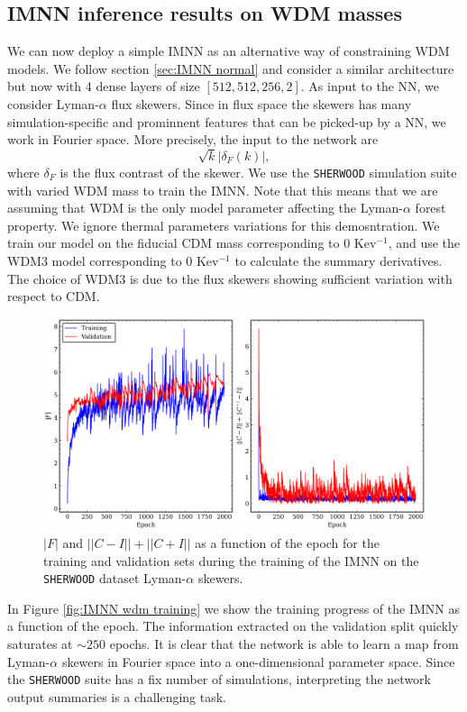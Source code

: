 \subsection{IMNN inference results on WDM masses}\label{sec:IMNN}
We can now deploy a simple IMNN as an alternative way of constraining WDM models. We follow section \ref{sec:IMNN normal} and consider a similar architecture but now with 4 dense layers of size $[512, 512, 256, 2]$. As input to the NN, we consider Lyman-$\alpha$ flux skewers. Since in flux space the skewers has many simulation-specific and prominnent features that can be picked-up by a NN, we work in Fourier space. More precisely, the input to the network are 
\begin{equation}
    \sqrt{k} |\delta_F (k)|,
\end{equation}
where $\delta_F$ is the flux contrast of the skewer.
We use the \texttt{SHERWOOD} simulation suite with varied WDM mass to train the IMNN. Note that this means that we are assuming that WDM is the only model parameter affecting the Lyman-$\alpha$ forest property. We ignore thermal parameters variations for this demosntration. We train our model on the fiducial CDM mass corresponding to $0$ Kev$^{-1}$, and use the WDM3 model corresponding to $0$ Kev$^{-1}$ to calculate the summary derivatives. The choice of WDM3 is due to the flux skewers showing sufficient variation with respect to CDM.

\begin{figure}
    \centering
    \includegraphics[width=0.95\linewidth]{img/ML/WDM_training_plot.png}
    \caption{$|F|$ and $||C-I ||+||C+I||$ as a function of the epoch for the training and validation sets during the training of the IMNN on the \texttt{SHERWOOD} dataset Lyman-$\alpha$ skewers.}
    \label{fig:IMNN  wdm training}
\end{figure}
In Figure \ref{fig:IMNN wdm training} we show the training progress of the IMNN as a function of the epoch. The information extracted on the validation split quickly saturates at $\sim 250$ epochs. It is clear that the network is able to learn a map from Lyman-$\alpha$ skewers in Fourier space into a one-dimensional parameter space. Since the \texttt{SHERWOOD} suite has a fix number of simulations, interpreting the network output summaries is a challenging task.


